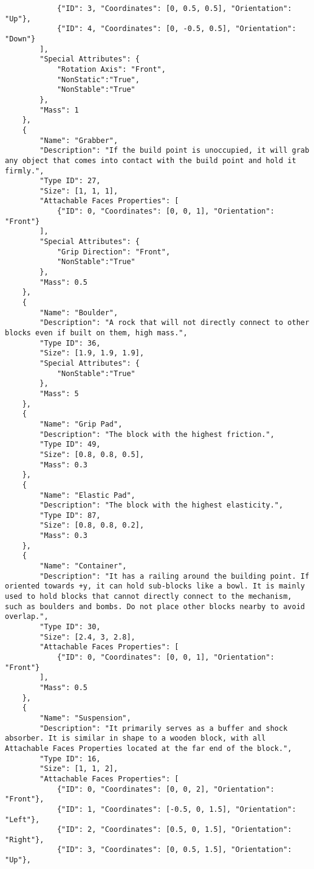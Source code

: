 \begin{lstlisting}
            {"ID": 3, "Coordinates": [0, 0.5, 0.5], "Orientation": "Up"},
            {"ID": 4, "Coordinates": [0, -0.5, 0.5], "Orientation": "Down"}
        ],
        "Special Attributes": {
            "Rotation Axis": "Front",
            "NonStatic":"True",
            "NonStable":"True"
        },
        "Mass": 1
    },
    {
        "Name": "Grabber",
        "Description": "If the build point is unoccupied, it will grab any object that comes into contact with the build point and hold it firmly.",
        "Type ID": 27,
        "Size": [1, 1, 1],
        "Attachable Faces Properties": [
            {"ID": 0, "Coordinates": [0, 0, 1], "Orientation": "Front"}
        ],
        "Special Attributes": {
            "Grip Direction": "Front",
            "NonStable":"True"
        },
        "Mass": 0.5
    },
    {
        "Name": "Boulder",
        "Description": "A rock that will not directly connect to other blocks even if built on them, high mass.",
        "Type ID": 36,
        "Size": [1.9, 1.9, 1.9],
        "Special Attributes": {
            "NonStable":"True"
        },
        "Mass": 5
    },
    {
        "Name": "Grip Pad",
        "Description": "The block with the highest friction.",
        "Type ID": 49,
        "Size": [0.8, 0.8, 0.5],
        "Mass": 0.3
    },
    {
        "Name": "Elastic Pad",
        "Description": "The block with the highest elasticity.",
        "Type ID": 87,
        "Size": [0.8, 0.8, 0.2],
        "Mass": 0.3
    },
    {
        "Name": "Container",
        "Description": "It has a railing around the building point. If oriented towards +y, it can hold sub-blocks like a bowl. It is mainly used to hold blocks that cannot directly connect to the mechanism, such as boulders and bombs. Do not place other blocks nearby to avoid overlap.",
        "Type ID": 30,
        "Size": [2.4, 3, 2.8],
        "Attachable Faces Properties": [
            {"ID": 0, "Coordinates": [0, 0, 1], "Orientation": "Front"}
        ],
        "Mass": 0.5
    },
    {
        "Name": "Suspension",
        "Description": "It primarily serves as a buffer and shock absorber. It is similar in shape to a wooden block, with all Attachable Faces Properties located at the far end of the block.",
        "Type ID": 16,
        "Size": [1, 1, 2],
        "Attachable Faces Properties": [
            {"ID": 0, "Coordinates": [0, 0, 2], "Orientation": "Front"},
            {"ID": 1, "Coordinates": [-0.5, 0, 1.5], "Orientation": "Left"},
            {"ID": 2, "Coordinates": [0.5, 0, 1.5], "Orientation": "Right"},
            {"ID": 3, "Coordinates": [0, 0.5, 1.5], "Orientation": "Up"},

\end{lstlisting}
